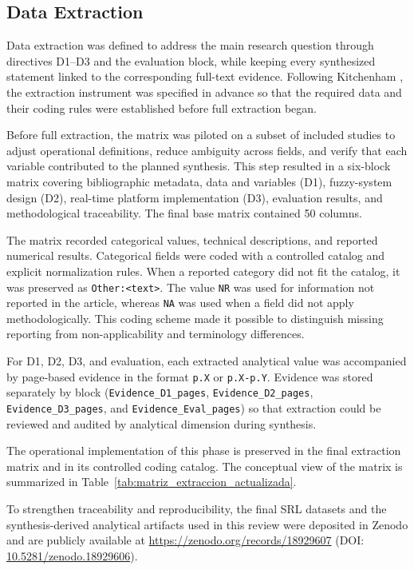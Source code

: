 \subsection{Data Extraction}
Data extraction was defined to address the main research question through directives D1--D3 and the evaluation block, while keeping every synthesized statement linked to the corresponding full-text evidence. Following Kitchenham \cite{kitchenham2007}, the extraction instrument was specified in advance so that the required data and their coding rules were established before full extraction began.

Before full extraction, the matrix was piloted on a subset of included studies to adjust operational definitions, reduce ambiguity across fields, and verify that each variable contributed to the planned synthesis. This step resulted in a six-block matrix covering bibliographic metadata, data and variables (D1), fuzzy-system design (D2), real-time platform implementation (D3), evaluation results, and methodological traceability. The final base matrix contained 50 columns.

The matrix recorded categorical values, technical descriptions, and reported numerical results. Categorical fields were coded with a controlled catalog and explicit normalization rules. When a reported category did not fit the catalog, it was preserved as \texttt{Other:<text>}. The value \texttt{NR} was used for information not reported in the article, whereas \texttt{NA} was used when a field did not apply methodologically. This coding scheme made it possible to distinguish missing reporting from non-applicability and terminology differences.

For D1, D2, D3, and evaluation, each extracted analytical value was accompanied by page-based evidence in the format \texttt{p.X} or \texttt{p.X-p.Y}. Evidence was stored separately by block (\texttt{Evidence\_D1\_pages}, \texttt{Evidence\_D2\_pages}, \texttt{Evidence\_D3\_pages}, and \texttt{Evidence\_Eval\_pages}) so that extraction could be reviewed and audited by analytical dimension during synthesis.

The operational implementation of this phase is preserved in the final extraction matrix and in its controlled coding catalog. The conceptual view of the matrix is summarized in Table~\ref{tab:matriz_extraccion_actualizada}.

To strengthen traceability and reproducibility, the final SRL datasets and the synthesis-derived analytical artifacts used in this review were deposited in Zenodo and are publicly available at \url{https://zenodo.org/records/18929607} (DOI: \href{https://doi.org/10.5281/zenodo.18929606}{10.5281/zenodo.18929606}).

